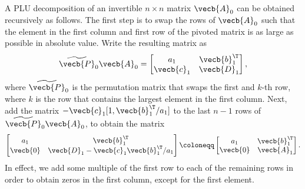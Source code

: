 A PLU decomposition of an invertible $n \times n$ matrix $\vecb{A}_0$ can be obtained recursively as follows. The first step is to swap the rows of $\vecb{A}_0$ such that the element in the first column and first row of the pivoted matrix is as large as possible in absolute value. Write the resulting matrix as
\begin{equation*}
	\widetilde{\vecb{P}}_0 \vecb{A}_0 =
	\begin{bmatrix}
		a_1        & \vecb{b}_1^\T \\
		\vecb{c}_1 & \vecb{D}_1
	\end{bmatrix},
\end{equation*}
where $\widetilde{\vecb{P}}_0$ is the permutation matrix that swaps the first and $k$-th row, where $k$ is the row that contains the largest element in the first column. Next, add the matrix $-\vecb{c}_1 [1, \vecb{b}_1^\T / a_1]$ to the last $n-1$ rows of $\widetilde{\vecb{P}}_0 \vecb{A}_0$, to obtain the matrix
\begin{equation*}
	\begin{bmatrix}
		a_1      & \vecb{b}_1^\T                               \\
		\vecb{0} & \vecb{D}_1 - \vecb{c}_1 \vecb{b}_1^\T / a_1
	\end{bmatrix}
	\coloneqq
	\begin{bmatrix}
		a_1      & \vecb{b}_1^\T \\
		\vecb{0} & \vecb{A}_1
	\end{bmatrix}.
\end{equation*}
In effect, we add some multiple of the first row to each of the remaining rows in order to obtain zeros in the first column, except for the first element.

